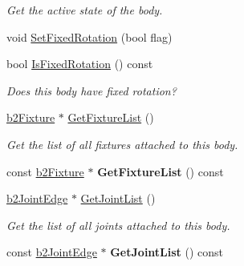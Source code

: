 \begin{DoxyCompactItemize}
\begin{DoxyCompactList}\small\item\em Get the active state of the body. \end{DoxyCompactList}\item 
void \hyperlink{classb2_body_aff35078e2a221d2d05409674936cb8d2}{Set\+Fixed\+Rotation} (bool flag)
\item 
bool \hyperlink{classb2_body_a6bef51a11a1fec3fddad273b11c14214}{Is\+Fixed\+Rotation} () const \hypertarget{classb2_body_a6bef51a11a1fec3fddad273b11c14214}{}\label{classb2_body_a6bef51a11a1fec3fddad273b11c14214}

\begin{DoxyCompactList}\small\item\em Does this body have fixed rotation? \end{DoxyCompactList}\item 
\hyperlink{classb2_fixture}{b2\+Fixture} $\ast$ \hyperlink{classb2_body_a64634da20c6e0ab2d68a3cc9ea15efc3}{Get\+Fixture\+List} ()\hypertarget{classb2_body_a64634da20c6e0ab2d68a3cc9ea15efc3}{}\label{classb2_body_a64634da20c6e0ab2d68a3cc9ea15efc3}

\begin{DoxyCompactList}\small\item\em Get the list of all fixtures attached to this body. \end{DoxyCompactList}\item 
const \hyperlink{classb2_fixture}{b2\+Fixture} $\ast$ {\bfseries Get\+Fixture\+List} () const \hypertarget{classb2_body_aa4c739bb2be1d255606e199c1554e2ca}{}\label{classb2_body_aa4c739bb2be1d255606e199c1554e2ca}

\item 
\hyperlink{structb2_joint_edge}{b2\+Joint\+Edge} $\ast$ \hyperlink{classb2_body_a55cf2eb851780599ca5c1f6f25a17e41}{Get\+Joint\+List} ()\hypertarget{classb2_body_a55cf2eb851780599ca5c1f6f25a17e41}{}\label{classb2_body_a55cf2eb851780599ca5c1f6f25a17e41}

\begin{DoxyCompactList}\small\item\em Get the list of all joints attached to this body. \end{DoxyCompactList}\item 
const \hyperlink{structb2_joint_edge}{b2\+Joint\+Edge} $\ast$ {\bfseries Get\+Joint\+List} () const \hypertarget{classb2_body_afd11fde6189a374716b9d581476d38af}{}\label{classb2_body_afd11fde6189a374716b9d581476d38af}


\end{DoxyCompactItemize}
